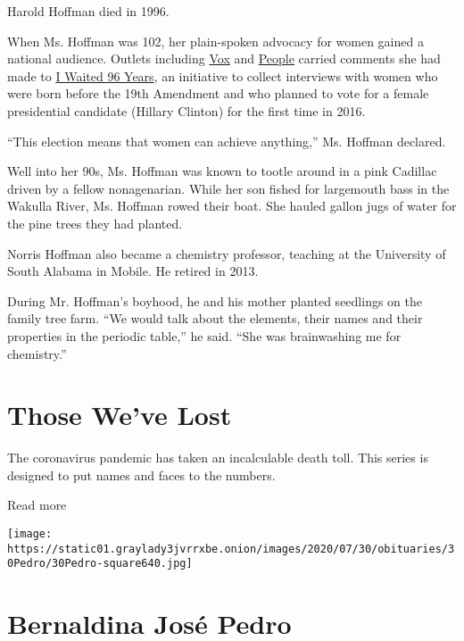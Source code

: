 Harold Hoffman died in 1996.

When Ms. Hoffman was 102, her plain-spoken advocacy for women gained a
national audience. Outlets including
\href{https://www.vox.com/policy-and-politics/2016/11/8/13562474/women-right-to-vote-96-years-hillary-clinton}{Vox}
and
\href{https://people.com/politics/i-waited-96-years-women-born-before-19th-amendment-vote-for-woman-president-hillary-clinton/}{People}
carried comments she had made to
\href{https://www.iwaited96years.com/}{I Waited 96 Years}, an initiative
to collect interviews with women who were born before the 19th Amendment
and who planned to vote for a female presidential candidate (Hillary
Clinton) for the first time in 2016.

``This election means that women can achieve anything,'' Ms. Hoffman
declared.

Well into her 90s, Ms. Hoffman was known to tootle around in a pink
Cadillac driven by a fellow nonagenarian. While her son fished for
largemouth bass in the Wakulla River, Ms. Hoffman rowed their boat. She
hauled gallon jugs of water for the pine trees they had planted.

Norris Hoffman also became a chemistry professor, teaching at the
University of South Alabama in Mobile. He retired in 2013.

During Mr. Hoffman's boyhood, he and his mother planted seedlings on the
family tree farm. ``We would talk about the elements, their names and
their properties in the periodic table,'' he said. ``She was
brainwashing me for chemistry.''

\href{https://www.nytimes3xbfgragh.onion/interactive/2020/obituaries/people-died-coronavirus-obituaries.html?action=click\&pgtype=Article\&state=default\&region=BELOW_MAIN_CONTENT\&context=covid_obits_promo}{}

\hypertarget{those-weve-lost}{%
\section{Those We've Lost}\label{those-weve-lost}}

The coronavirus pandemic has taken an incalculable death toll. This
series is designed to put names and faces to the numbers.

Read more

\texttt{[image: https://static01.graylady3jvrrxbe.onion/images/2020/07/30/obituaries/30Pedro/30Pedro-square640.jpg]}

\hypertarget{bernaldina-josuxe9-pedro}{%
\section{Bernaldina José Pedro}\label{bernaldina-josuxe9-pedro}}

